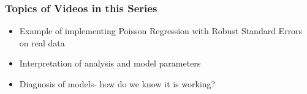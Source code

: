 \documentclass{beamer}
\begin{document}
\begin{frame}[fragile]\frametitle{Topics of Videos in this Series}
	
	\begin{itemize}
	
		\item Example of implementing Poisson Regression with Robust Standard Errors on real data
		
		\item Interpretation of analysis and model parameters
		
		\item Diagnosis of models- how do we know it is working?
	
	\end{itemize}

	
\end{frame}
\end{document}
